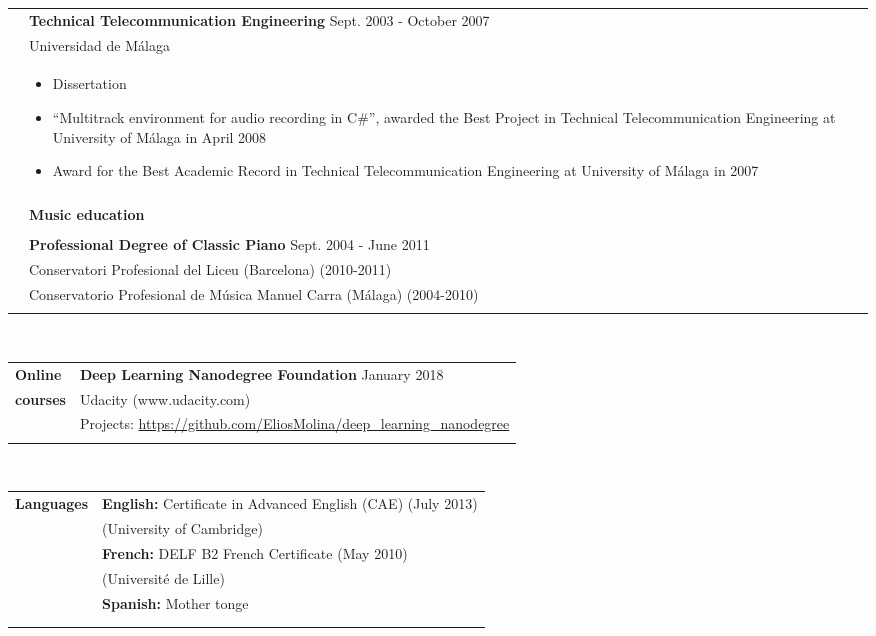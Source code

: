 \documentclass[letterpaper,11pt,oneside]{article}
\begin{document}
\noindent \begin{tabularx}{\linewidth}{l X}
     \hspace{2.5cm} & \textbf{Technical Telecommunication Engineering} \hfill Sept. 2003 - October 2007\\
     & Universidad de Málaga\\
     & \vspace{-0.1cm}\begin{itemize}[nosep,noitemsep,topsep=0pt,partopsep=0pt]
         \item Dissertation
         \item[] ``Multitrack environment for audio recording in C\#'', awarded the Best Project in Technical Telecommunication Engineering at University of Málaga in April 2008
         \item Award for the Best Academic Record in Technical Telecommunication Engineering at University of Málaga in 2007
     \end{itemize}\\
     \\
     & \textbf{\normalsize{Music education}}\\
     \\
     \hspace{2.5cm} & \textbf{Professional Degree of Classic Piano} \hfill Sept. 2004 - June 2011\\
     & Conservatori Profesional del Liceu (Barcelona) (2010-2011)\\
     & Conservatorio Profesional de Música Manuel Carra (Málaga) (2004-2010)
     &\\
     \\
\end{tabularx}
\\
\noindent \begin{tabularx}{\linewidth}{l X}
 \Large{\textbf{Online\hspace{0.9cm}}}    & \textbf{Deep Learning Nanodegree Foundation} \hfill January 2018\\
\Large{\textbf{courses}} & Udacity (www.udacity.com)\\
     & Projects: \url{https://github.com/EliosMolina/deep_learning_nanodegree}
     &\\
     \\
\end{tabularx}
\\
\noindent \begin{tabularx}{\linewidth}{l X}
\Large{\textbf{Languages}}    & \textbf{English:} Certificate in Advanced English (CAE) (July 2013)\\
    & (University of Cambridge)\\
    & \textbf{French:} DELF B2 French Certificate (May 2010)\\
    & (Université de Lille)\\
    & \textbf{Spanish:} Mother tonge\\
    & \\
    \\
\end{tabularx}
\end{document}
